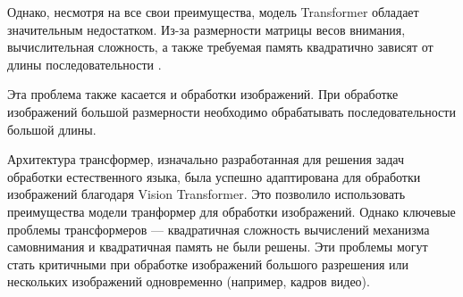 \documentclass[times,specification,annotation]{itmo-student-thesis}
\begin{document}
Однако, несмотря на все свои преимущества, модель Transformer обладает значительным недостатком. Из-за размерности матрицы весов внимания, вычислительная сложность, а также требуемая память квадратично зависят от длины последовательности \cite{transformer_computation_complexity}.

Эта проблема также касается и обработки изображений. При обработке изображений большой размерности необходимо обрабатывать последовательности большой длины.

\s\chapterconclusion
Архитектура трансформер, изначально разработанная для решения задач обработки естественного языка, была успешно адаптирована для обработки изображений благодаря Vision Transformer. Это позволило использовать преимущества модели транформер для обработки изображений. Однако ключевые проблемы трансформеров — квадратичная сложность вычислений механизма самовнимания и квадратичная память не были решены. Эти проблемы могут стать критичными при обработке изображений большого разрешения или нескольких изображений одновременно (например, кадров видео).
\end{document}
